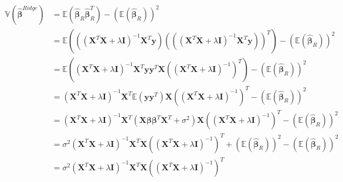 \begin{align*}
    \mathbb{V}(\boldsymbol{\hat{\beta}}^{Ridge}) &= \mathbb{E} (\boldsymbol{\hat{\beta}}_{R} \boldsymbol{\hat{\beta}}_{R}^{T}) - (\mathbb{E} (\boldsymbol{\hat{\beta}}_{R}))^{2} \\
    &= \mathbb{E} (((\boldsymbol{X}^{T}\boldsymbol{X} + \lambda \boldsymbol{I})^{-1} \boldsymbol{X}^{T} \boldsymbol{y}) (((\boldsymbol{X}^{T}\boldsymbol{X} + \lambda \boldsymbol{I})^{-1} \boldsymbol{X}^{T} \boldsymbol{y}))^{T}) - (\mathbb{E} (\boldsymbol{\hat{\beta}}_{R}))^{2} \\
    &= \mathbb{E} ((\boldsymbol{X}^{T}\boldsymbol{X} + \lambda \boldsymbol{I})^{-1} \boldsymbol{X}^{T} \boldsymbol{y} \boldsymbol{y}^{T} \boldsymbol{X} ((\boldsymbol{X}^{T}\boldsymbol{X} + \lambda \boldsymbol{I})^{-1})^{T} ) - (\mathbb{E} (\boldsymbol{\hat{\beta}}_{R}))^{2} \\
    &= (\boldsymbol{X}^{T}\boldsymbol{X} + \lambda \boldsymbol{I})^{-1} \boldsymbol{X}^{T} \mathbb{E} (\boldsymbol{y} \boldsymbol{y}^{T} ) \boldsymbol{X} ((\boldsymbol{X}^{T}\boldsymbol{X} + \lambda \boldsymbol{I})^{-1})^{T} - (\mathbb{E} (\boldsymbol{\hat{\beta}}_{R}))^{2} \\
    &= (\boldsymbol{X}^{T}\boldsymbol{X} + \lambda \boldsymbol{I})^{-1} \boldsymbol{X}^{T} (\boldsymbol{X} \boldsymbol{\beta} \boldsymbol{\beta}^{T} \boldsymbol{X}^{T} + \sigma^{2}) \boldsymbol{X} ((\boldsymbol{X}^{T}\boldsymbol{X} + \lambda \boldsymbol{I})^{-1})^{T} - (\mathbb{E} (\boldsymbol{\hat{\beta}}_{R}))^{2} \\
    &= \sigma^{2}(\boldsymbol{X}^{T}\boldsymbol{X} + \lambda \boldsymbol{I})^{-1} \boldsymbol{X}^{T} \boldsymbol{X} ((\boldsymbol{X}^{T}\boldsymbol{X} + \lambda \boldsymbol{I})^{-1})^{T} + (\mathbb{E} (\boldsymbol{\hat{\beta}}_{R}))^{2} - (\mathbb{E} (\boldsymbol{\hat{\beta}}_{R}))^{2} \\
    &= \sigma^{2}(\boldsymbol{X}^{T}\boldsymbol{X} + \lambda \boldsymbol{I})^{-1} \boldsymbol{X}^{T} \boldsymbol{X} ((\boldsymbol{X}^{T}\boldsymbol{X} + \lambda \boldsymbol{I})^{-1})^{T} \\
\end{align*}


